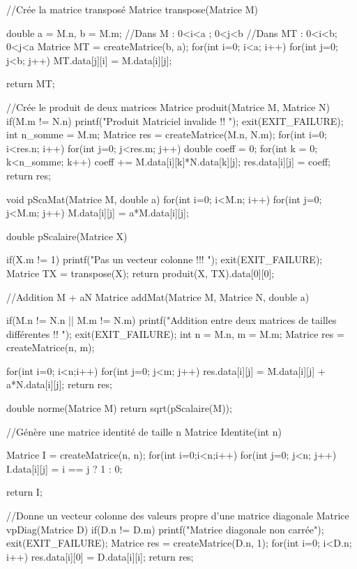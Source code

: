 \documentclass[12pt]{article}
\begin{document}
\begin{C}
//Crée la matrice transposé
Matrice transpose(Matrice M)
{
    double a = M.n, b = M.m;
    //Dans M : 0<i<a ; 0<j<b
    //Dans MT : 0<i<b; 0<j<a
    Matrice MT = createMatrice(b, a);
    for(int i=0; i<a; i++)
    {
        for(int j=0; j<b; j++)
        {
            MT.data[j][i] = M.data[i][j];
        }
    }
    
    return MT;
}

//Crée le produit de deux matrices
Matrice produit(Matrice M, Matrice N)
{
    if(M.m != N.n)
    {
        printf("Produit Matriciel invalide !! \n");
        exit(EXIT_FAILURE);
    }
    int n_somme = M.m;
    Matrice res = createMatrice(M.n, N.m);
    for(int i=0; i<res.n; i++)
    {
        for(int j=0; j<res.m; j++)
        {
            double coeff = 0;
            for(int k = 0; k<n_somme; k++)
            {
                coeff += M.data[i][k]*N.data[k][j];
            }
            res.data[i][j] = coeff;
        }
    }
    return res;
}

void pScaMat(Matrice M, double a){
    for(int i=0; i<M.n; i++)
    {
        for(int j=0; j<M.m; j++)
        {
            M.data[i][j] = a*M.data[i][j];
        }
    }
}

double pScalaire(Matrice X)
{
    if(X.m != 1)
    {
        printf("Pas un vecteur colonne !!! \n");
        exit(EXIT_FAILURE);
    }
    Matrice TX = transpose(X);
    return produit(X, TX).data[0][0];
    
}
//Addition M + aN
Matrice addMat(Matrice M, Matrice N, double a)
{
    if(M.n != N.n || M.m != N.m)
    {
        printf("Addition entre deux matrices de tailles différentes !! \n");
        exit(EXIT_FAILURE);
    }
    int n = M.n, m = M.m;
    Matrice res = createMatrice(n, m);
    
    for(int i=0; i<n;i++)
    {
        for(int j=0; j<m; j++)
        {
            res.data[i][j] = M.data[i][j] + a*N.data[i][j];
        }
    }
    return res;
}

double norme(Matrice M)
{
    return sqrt(pScalaire(M));
}

//Génère une matrice identité de taille n
Matrice Identite(int n)
{
    Matrice I = createMatrice(n, n);
    for(int i=0;i<n;i++)
    {
        for(int j=0; j<n; j++)
        {
            I.data[i][j] = i == j ? 1 : 0;
        }
    }
    
    return I;
}

//Donne un vecteur colonne des valeurs propre d'une matrice diagonale
Matrice vpDiag(Matrice D)
{
    if(D.n != D.m){
        printf("Matrice diagonale non carrée");
        exit(EXIT_FAILURE);
    }
    Matrice res = createMatrice(D.n, 1);
    for(int i=0; i<D.n; i++){
        res.data[i][0] = D.data[i][i];
    }
    return res;
}



\end{C}
\end{document}
